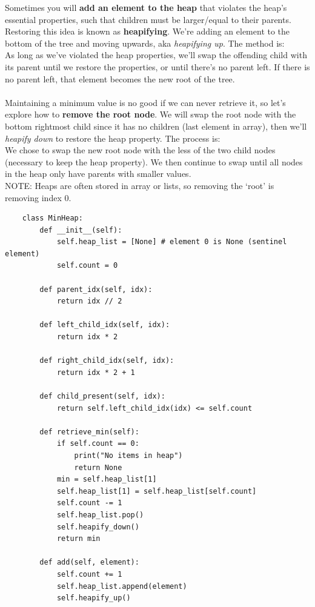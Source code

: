 \documentclass[11pt, a4paper]{article}
\begin{document}
\begin{spacing}{1.1}
	\noindent Sometimes you will \textbf{add an element to the heap} that violates the heap’s essential properties, such that children must be larger/equal to their parents. Restoring this idea is known as \textbf{heapifying}. We’re adding an element to the bottom of the tree and moving upwards, aka \textit{heapifying up}. The method is: \vspace*{1mm} \\
	As long as we’ve violated the heap properties, we’ll swap the offending child with its parent until we restore the properties, or until there’s no parent left. If there is no parent left, that element becomes the new root of the tree. \\~\\
	Maintaining a minimum value is no good if we can never retrieve it, so let’s explore how to \textbf{remove the root node}. We will swap the root node with the bottom rightmost child since it has no children (last element in array), then we’ll \textit{heapify down} to restore the heap property. The process is: \vspace*{1mm} \\
	We chose to swap the new root node with the less of the two child nodes (necessary to keep the heap property). We then continue to swap until all nodes in the heap only have parents with smaller values. \vspace*{2mm} \\
	NOTE: Heaps are often stored in array or lists, so removing the `root' is removing index 0.
	\begin{lstlisting}
	class MinHeap:
		def __init__(self):
			self.heap_list = [None] # element 0 is None (sentinel element)
			self.count = 0
		
		def parent_idx(self, idx):
			return idx // 2
		
		def left_child_idx(self, idx):
			return idx * 2
		
		def right_child_idx(self, idx):
			return idx * 2 + 1
		
		def child_present(self, idx):
			return self.left_child_idx(idx) <= self.count
		
		def retrieve_min(self):
			if self.count == 0:
				print("No items in heap")
				return None
			min = self.heap_list[1]
			self.heap_list[1] = self.heap_list[self.count]
			self.count -= 1
			self.heap_list.pop()
			self.heapify_down()
			return min
		
		def add(self, element):
			self.count += 1
			self.heap_list.append(element)
			self.heapify_up()
		

\end{lstlisting}
\end{spacing}
\end{document}
